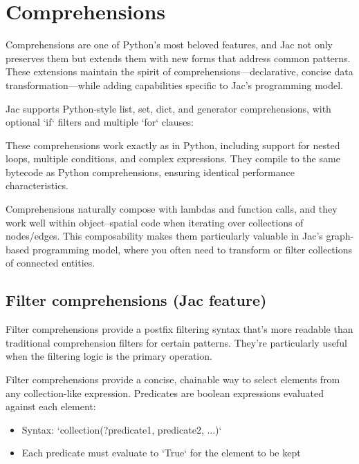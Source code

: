 \section{Comprehensions}

Comprehensions are one of Python's most beloved features, and Jac not only preserves them but extends them with new forms that address common patterns. These extensions maintain the spirit of comprehensions—declarative, concise data transformation—while adding capabilities specific to Jac's programming model.

Jac supports Python-style list, set, dict, and generator comprehensions, with optional `if` filters and multiple `for` clauses:


These comprehensions work exactly as in Python, including support for nested loops, multiple conditions, and complex expressions. They compile to the same bytecode as Python comprehensions, ensuring identical performance characteristics.

Comprehensions naturally compose with lambdas and function calls, and they work well within object–spatial code when iterating over collections of nodes/edges. This composability makes them particularly valuable in Jac's graph-based programming model, where you often need to transform or filter collections of connected entities.

\subsection{Filter comprehensions (Jac feature)}

Filter comprehensions provide a postfix filtering syntax that's more readable than traditional comprehension filters for certain patterns. They're particularly useful when the filtering logic is the primary operation.

Filter comprehensions provide a concise, chainable way to select elements from any collection-like expression. Predicates are boolean expressions evaluated against each element:

\begin{itemize}
    \item Syntax: `collection(?predicate1, predicate2, ...)`
    \item Each predicate must evaluate to `True` for the element to be kept
\end{itemize}

